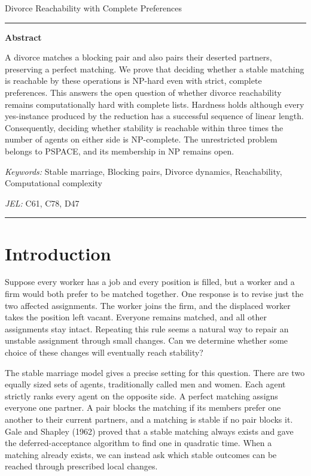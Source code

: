 \documentclass[11pt,letterpaper]{article}
\theoremstyle{definition}
\begin{document}
\begin{center}
{\Large Divorce Reachability with Complete Preferences}
\end{center}
\vspace{1.25cm}
\hrule
\vspace{.8em}
\noindent\textbf{Abstract}
\par\noindent
A divorce matches a blocking pair and also pairs their deserted partners, preserving a perfect matching. We prove that deciding whether a stable matching is reachable by these operations is NP-hard even with strict, complete preferences. This answers the open question of whether divorce reachability remains computationally hard with complete lists. Hardness holds although every yes-instance produced by the reduction has a successful sequence of linear length. Consequently, deciding whether stability is reachable within three times the number of agents on either side is NP-complete. The unrestricted problem belongs to PSPACE, and its membership in NP remains open.

\noindent\textit{Keywords:} Stable marriage, Blocking pairs, Divorce dynamics, Reachability, Computational complexity

\noindent\textit{JEL:} C61, C78, D47
\vspace{.75em}
\hrule
\vspace{1.0em}

\section{Introduction}

Suppose every worker has a job and every position is filled, but a worker and a firm would both prefer to be matched together. One response is to revise just the two affected assignments. The worker joins the firm, and the displaced worker takes the position left vacant. Everyone remains matched, and all other assignments stay intact. Repeating this rule seems a natural way to repair an unstable assignment through small changes. Can we determine whether some choice of these changes will eventually reach stability?

The stable marriage model gives a precise setting for this question. There are two equally sized sets of agents, traditionally called men and women. Each agent strictly ranks every agent on the opposite side. A perfect matching assigns everyone one partner. A pair blocks the matching if its members prefer one another to their current partners, and a matching is stable if no pair blocks it. Gale and Shapley (1962) proved that a stable matching always exists and gave the deferred-acceptance algorithm to find one in quadratic time. When a matching already exists, we can instead ask which stable outcomes can be reached through prescribed local changes.
\end{document}
